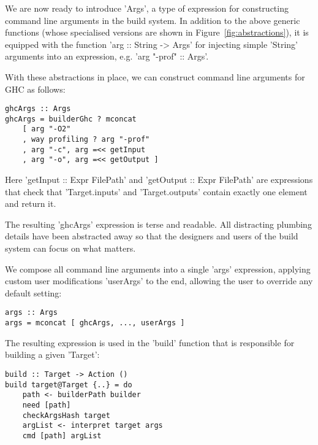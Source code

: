 We are now ready to introduce \lst'Args', a type of expression for
constructing command line arguments in the build system. In addition to the
above generic functions (whose specialised versions are shown in
Figure~\ref{fig:abstractions}), it is equipped with the function
\lst'arg :: String -> Args' for injecting simple \lst'String' arguments into
an expression, e.g. \lst'arg "-prof" :: Args'.

With these abstractions in place, we can construct command
line arguments for GHC as follows:

\begin{lstlisting}
ghcArgs :: Args
ghcArgs = builderGhc ? mconcat
    [ arg "-O2"
    , way profiling ? arg "-prof"
    , arg "-c", arg =<< getInput
    , arg "-o", arg =<< getOutput ]
\end{lstlisting}

\noindent Here \lst'getInput :: Expr FilePath' and
\lst'getOutput :: Expr FilePath' are expressions that check that
\lst'Target.inputs' and \lst'Target.outputs' contain exactly one element and
return it.

The resulting \lst'ghcArgs' expression is terse and readable. All
distracting plumbing details have been abstracted away so that the designers and
users of the build system can focus on what matters.


We compose all command line arguments into a single \lst'args' expression,
applying custom user modifications \lst'userArgs' to the end,
allowing the user to override any default setting:

\begin{lstlisting}
args :: Args
args = mconcat [ ghcArgs, ..., userArgs ]
\end{lstlisting}

The resulting expression is used in the \lst'build' function that is responsible
for building a given \lst'Target':

\begin{lstlisting}
build :: Target -> Action ()
build target@Target {..} = do
    path <- builderPath builder
    need [path]
    checkArgsHash target
    argList <- interpret target args
    cmd [path] argList
\end{lstlisting}

